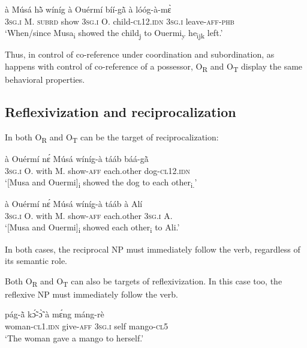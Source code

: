 \documentclass[output=paper]{langsci/langscibook}
\begin{document}
\ea
\label{ex:40.pacchiarotti}
\gll à Músá hə̃̀ wíníg à Ouérmí bíí-g\`{ã} à lóóg-à-mɛ̀\\
\textsc{3sg.i}    M.  \textsc{subrd}    show  \textsc{3sg.i}    O.        child-\textsc{cl12.idn} \textsc{3sg.i}    leave-\textsc{aff-phb}\\
\glt `When/since Musa\textsubscript{i} showed the child\textsubscript{j} to Ouermi\textsubscript{y} he\textsubscript{ijk} left.'
\z

Thus, in control of co-reference under coordination and subordination, as happens with control of co-reference of a possessor, O\textsubscript{R} and O\textsubscript{T} display the same behavioral properties. 

\subsection{Reflexivization and reciprocalization}\label{§5.4:reflexivization.pacchiarotti}

In  both O\textsubscript{R}  and O\textsubscript{T}  can be the target of reciprocalization:

\ea
\label{ex:41.pacchiarotti}
\gll à    Ouérmí  nɛ́  Músá  wíníg-à  tááb    báá-g\`{ã} \\
\textsc{3sg.i}    O.    with  M.  show-\textsc{aff}  each.other  dog-\textsc{cl12.idn}\\
\glt `[Musa and Ouermi]\textsubscript{i} showed the dog to each other\textsubscript{i.}'
\z

\ea
\label{ex:42.pacchiarotti}
\gll à    Ouérmí  nɛ́  Músá  wíníg-à  tááb    à    Alí\\
\textsc{3sg.i}    O.    with  M.  show-\textsc{aff}  each.other  \textsc{3sg.i}     A.\\
\glt `[Musa and Ouermi]\textsubscript{i} showed each other\textsubscript{i} to Ali.'
\z

In both cases, the reciprocal NP must immediately follow the verb, regardless of its semantic role. 

Both O\textsubscript{R} and O\textsubscript{T} can also be targets of reflexivization. In this case too, the reflexive NP must immediately follow the verb.

\ea
\label{ex:43.pacchiarotti}
\gll pág-\`{ã} kɔ̃́-ɔ̃̀ à mɛ́ng máng-rè\\
woman-\textsc{cl1.idn}  give-\textsc{aff}  \textsc{3sg.i}    self  mango-\textsc{cl5}\\
\glt `The woman gave a mango to herself.'
\z
\end{document}
